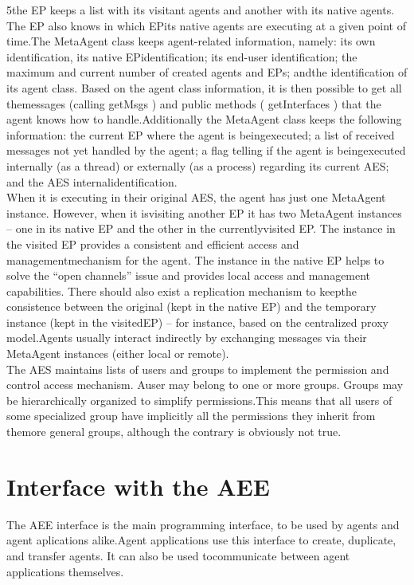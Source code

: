 \documentclass{article}
\begin{document}
 
5the EP keeps a list with its visitant agents and another with its native agents. The EP also knows in which EPits native agents are executing at a given point of time.The MetaAgent class keeps agent-related information, namely: its own identification, its native EPidentification; its end-user identification; the maximum and current number of created agents and EPs; andthe identification of its agent class. Based on the agent class information, it is then possible to get all themessages (calling
 getMsgs
) and public methods (
 getInterfaces
) that the agent knows how to handle.Additionally the MetaAgent class keeps the following information: the current EP where the agent is beingexecuted; a list of received messages not yet handled by the agent; a flag telling if the agent is beingexecuted internally (as a thread) or externally (as a process) regarding its current AES; and the AES internalidentification.\\When it is executing in their original AES, the agent has just one MetaAgent instance. However, when it isvisiting another EP it has two MetaAgent instances – one in its native EP and the other in the currentlyvisited EP. The instance in the visited EP provides a consistent and efficient access and managementmechanism for the agent. The instance in the native EP helps to solve the “open channels” issue and provides local access and management capabilities. There should also exist a replication mechanism to keepthe consistence between the original (kept in the native EP) and the temporary instance (kept in the visitedEP) – for instance, based on the centralized proxy model.Agents usually interact indirectly by exchanging messages via their MetaAgent instances (either local or remote).\\The AES maintains lists of users and groups to implement the permission and control access mechanism. Auser may belong to one or more groups. Groups may be hierarchically organized to simplify permissions.This means that all users of some specialized group have implicitly all the permissions they inherit from themore general groups, although the contrary is obviously not true.
\section{Interface with the AEE}
The AEE interface is the main programming interface, to be used by agents and agent aplications alike.Agent applications use this interface to create, duplicate, and transfer agents. It can also be used tocommunicate between agent applications themselves.
\end{document}

